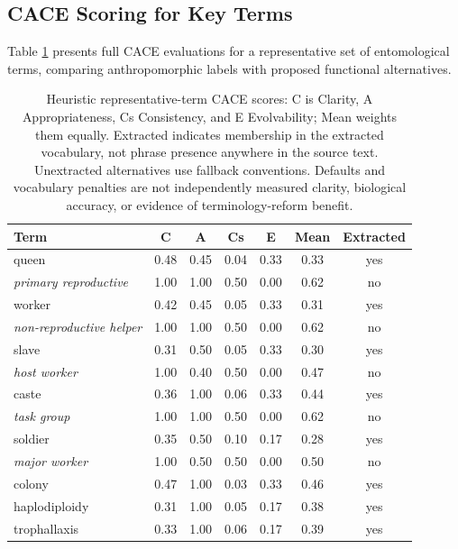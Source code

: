 \documentclass[
]{article}
\numberwithin{equation}{section}
\begin{document}
\subsection{CACE Scoring for Key
Terms}\label{cace-scoring-for-key-terms}

Table \ref{tab:cace_full} presents full CACE evaluations for a
representative set of entomological terms, comparing anthropomorphic
labels with proposed functional alternatives.

\begin{table}[h]
\centering
\small
\begin{tabular}{|l|c|c|c|c|c|c|}
\hline
\textbf{Term} & \textbf{C} & \textbf{A} & \textbf{Cs} & \textbf{E} & \textbf{Mean} & \textbf{Extracted} \\
\hline
queen & 0.48 & 0.45 & 0.04 & 0.33 & 0.33 & yes \\
\textit{primary reproductive} & 1.00 & 1.00 & 0.50 & 0.00 & 0.62 & no \\
\hline
worker & 0.42 & 0.45 & 0.05 & 0.33 & 0.31 & yes \\
\textit{non-reproductive helper} & 1.00 & 1.00 & 0.50 & 0.00 & 0.62 & no \\
\hline
slave & 0.31 & 0.50 & 0.05 & 0.33 & 0.30 & yes \\
\textit{host worker} & 1.00 & 0.40 & 0.50 & 0.00 & 0.47 & no \\
\hline
caste & 0.36 & 1.00 & 0.06 & 0.33 & 0.44 & yes \\
\textit{task group} & 1.00 & 1.00 & 0.50 & 0.00 & 0.62 & no \\
\hline
soldier & 0.35 & 0.50 & 0.10 & 0.17 & 0.28 & yes \\
\textit{major worker} & 1.00 & 0.50 & 0.50 & 0.00 & 0.50 & no \\
\hline
colony & 0.47 & 1.00 & 0.03 & 0.33 & 0.46 & yes \\
haplodiploidy & 0.31 & 1.00 & 0.05 & 0.17 & 0.38 & yes \\
trophallaxis & 0.33 & 1.00 & 0.06 & 0.17 & 0.39 & yes \\
\hline
\end{tabular}
\caption{Heuristic representative-term CACE scores: C is Clarity, A Appropriateness, Cs Consistency, and E Evolvability; Mean weights them equally. Extracted indicates membership in the extracted vocabulary, not phrase presence anywhere in the source text. Unextracted alternatives use fallback conventions. Defaults and vocabulary penalties are not independently measured clarity, biological accuracy, or evidence of terminology-reform benefit.}
\label{tab:cace_full}
\end{table}
\end{document}
